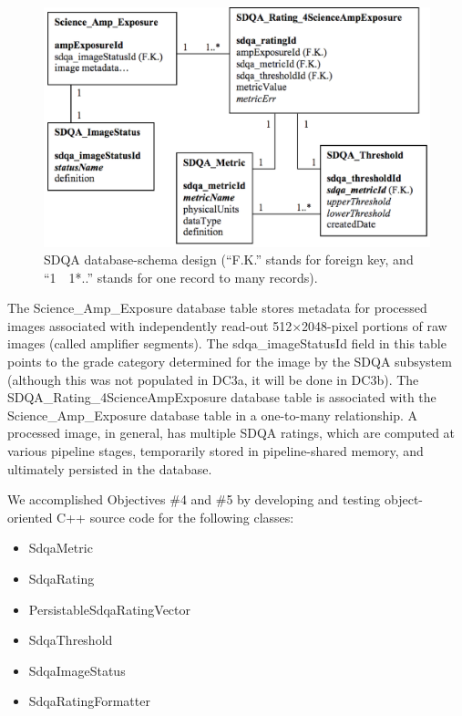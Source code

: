\begin{figure}[htb]
\begin{centering}
\includegraphics[scale=0.4]{images/O7A2_1}
\caption{SDQA database-schema design (``F.K.'' stands for foreign key, and ``1~{\jot 24pt}~1*..'' stands for one record to many records).} 
 \label{DB}
\end{centering}
\end{figure}

The Science\_Amp\_Exposure database table stores metadata for
processed images associated with independently read-out 
512$\times$2048-pixel portions of 
raw images (called amplifier 
segments).  The sdqa\_imageStatusId field in this table points to the grade
category determined for the image by the SDQA subsystem (although this was not populated
in DC3a, it will be done in DC3b).  
The SDQA\_Rating\_4ScienceAmpExposure database table is associated with 
the Science\_Amp\_Exposure database table in a one-to-many
relationship.  A processed image, in general, has multiple SDQA ratings, which
are computed at various pipeline stages, temporarily stored in pipeline-shared memory, and 
ultimately persisted in the database.


We accomplished Objectives \#4 and \#5 by developing and testing object-oriented C++
source code for the following classes:

\begin{itemize}
\item{SdqaMetric}
\item{SdqaRating}
\item{PersistableSdqaRatingVector}
\item{SdqaThreshold}
\item{SdqaImageStatus}
\item{SdqaRatingFormatter}
\end{itemize}

